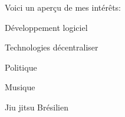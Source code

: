 \begin{cventries}
  \cventry
    {}
    {Voici un aperçu de mes intérêts:}
    {}
    {}
    {
      \begin{cvitems}
        \item {Développement logiciel}
        \item {Technologies décentraliser}
        \item {Politique}
        \item {Musique}
        \item {Jiu jitsu Brésilien}
      \end{cvitems}
    }
\end{cventries}
